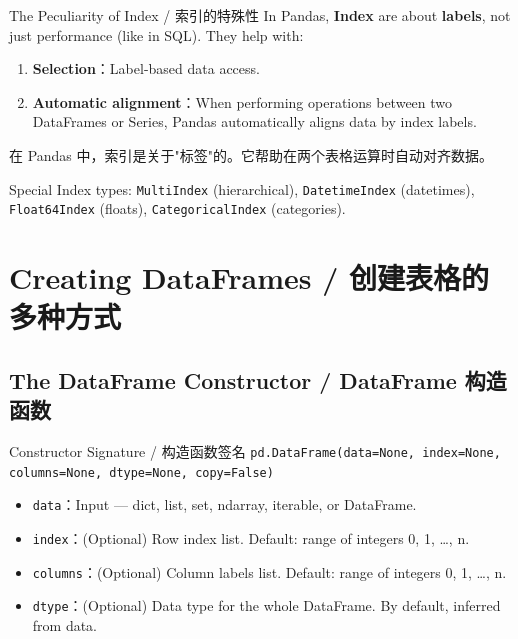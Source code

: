\documentclass[11pt,a4paper]{report}
\let\oldtexttt\texttt
\renewcommand{\texttt}[1]{\textcolor{mainblue}{\oldtexttt{#1}}}
\begin{document}
\begin{concept}{The Peculiarity of Index / 索引的特殊性}
    In Pandas, \textbf{Index} are about \textbf{labels}, not just performance (like in SQL). They help with:
    \begin{enumerate}[itemsep=0.3em]
        \item \textbf{Selection}：Label-based data access.
        \item \textbf{Automatic alignment}：When performing operations between two DataFrames or Series, Pandas automatically aligns data by index labels.
    \end{enumerate}
    在 Pandas 中，索引是关于"标签"的。它帮助在两个表格运算时自动对齐数据。

    Special Index types: \texttt{MultiIndex} (hierarchical), \texttt{DatetimeIndex} (datetimes), \texttt{Float64Index} (floats), \texttt{CategoricalIndex} (categories).
\end{concept}

\section{Creating DataFrames / 创建表格的多种方式}

\subsection{The DataFrame Constructor / DataFrame 构造函数}

\begin{concept}{Constructor Signature / 构造函数签名}
    \texttt{pd.DataFrame(data=None, index=None, columns=None, dtype=None, copy=False)}
    \begin{itemize}[itemsep=0.3em]
        \item \texttt{data}：Input — dict, list, set, ndarray, iterable, or DataFrame.
        \item \texttt{index}：(Optional) Row index list. Default: range of integers 0, 1, …, n.
        \item \texttt{columns}：(Optional) Column labels list. Default: range of integers 0, 1, …, n.
        \item \texttt{dtype}：(Optional) Data type for the whole DataFrame. By default, inferred from data.
    \end{itemize}
\end{concept}
\end{document}

